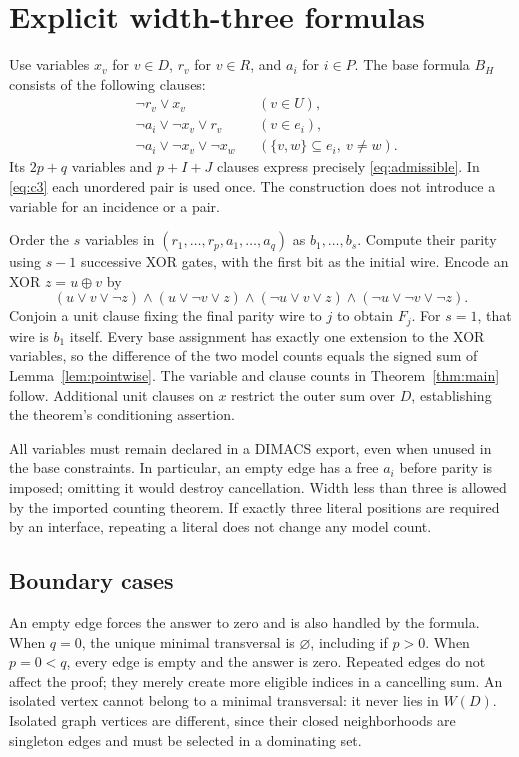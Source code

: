 \documentclass[11pt]{article}
\theoremstyle{remark}\newtheorem{remark}[theorem]{Remark}
\newcommand{\eps}{\varnothing}
\begin{document}
\section{Explicit width-three formulas}
Use variables $x_v$ for $v\in D$, $r_v$ for $v\in R$, and $a_i$ for $i\in P$.
The base formula $B_H$ consists of the following clauses:
\begin{align}
 &\neg r_v\vee x_v &&(v\in U),\label{eq:c1}\\
 &\neg a_i\vee\neg x_v\vee r_v &&(v\in e_i),\label{eq:c2}\\
 &\neg a_i\vee\neg x_v\vee\neg x_w
 &&(\{v,w\}\subseteq e_i,\ v\ne w).\label{eq:c3}
\end{align}
Its $2p+q$ variables and $p+I+J$ clauses express precisely
\eqref{eq:admissible}. In \eqref{eq:c3} each unordered pair is used once.
The construction does not introduce a variable for an incidence or a pair.

Order the $s$ variables in $(r_1,\ldots,r_p,a_1,\ldots,a_q)$ as
$b_1,\ldots,b_s$. Compute their parity using $s-1$ successive XOR gates, with
the first bit as the initial wire. Encode an XOR $z=u\mathbin\oplus v$ by
\begin{equation}\label{eq:xor}
 (u\vee v\vee\neg z)\wedge
 (u\vee\neg v\vee z)\wedge
 (\neg u\vee v\vee z)\wedge
 (\neg u\vee\neg v\vee\neg z).
\end{equation}
Conjoin a unit clause fixing the final parity wire to $j$ to obtain $F_j$.
For $s=1$, that wire is $b_1$ itself. Every base assignment has exactly one
extension to the XOR variables, so the difference of the two model counts
equals the signed sum of Lemma~\ref{lem:pointwise}. The variable and clause
counts in Theorem~\ref{thm:main} follow. Additional unit clauses on $x$ restrict
the outer sum over $D$, establishing the theorem's conditioning assertion.

All variables must remain declared in a DIMACS export, even when unused in
the base constraints. In particular, an empty edge has a free $a_i$ before
parity is imposed; omitting it would destroy cancellation. Width less than
three is allowed by the imported counting theorem. If exactly three literal
positions are required by an interface, repeating a literal does not change
any model count.

\subsection{Boundary cases}
An empty edge forces the answer to zero and is also handled by the formula.
When $q=0$, the unique minimal transversal is $\eps$, including if $p>0$.
When $p=0<q$, every edge is empty and the answer is zero. Repeated edges do
not affect the proof; they merely create more eligible indices in a cancelling
sum. An isolated vertex cannot belong to a minimal transversal: it never lies
in $W(D)$. Isolated graph vertices are different, since their closed
neighborhoods are singleton edges and must be selected in a dominating set.
\end{document}
